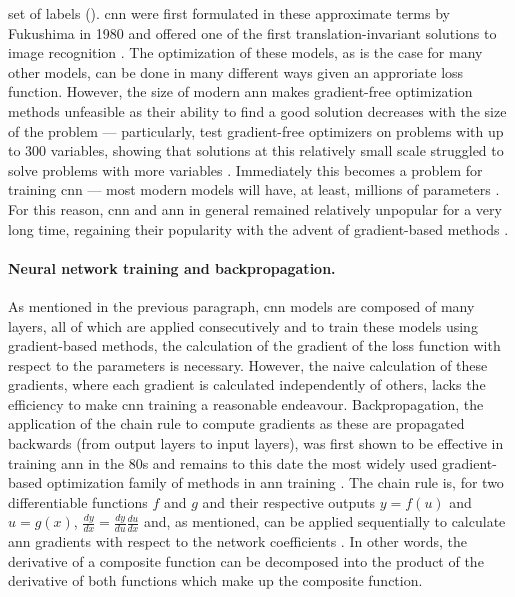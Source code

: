 set of labels (). \ac{cnn} were first formulated in these approximate terms by Fukushima in 1980 and offered one of the first translation-invariant solutions to image recognition \cite{Fukushima1980-bk}. The optimization of these models, as is the case for many other models, can be done in many different ways given an approriate loss function. However, the size of modern \ac{ann} makes gradient-free optimization methods unfeasible as their ability to find a good solution decreases with the size of the problem --- particularly,  test gradient-free optimizers on problems with up to 300 variables, showing that solutions at this relatively small scale struggled to solve problems with more variables \cite{Rios2013-bx}. Immediately this becomes a problem for training \ac{cnn} --- most modern models will have, at least, millions of parameters \cite{Li2021-xu}. For this reason, \ac{cnn} and \ac{ann} in general remained relatively unpopular for a very long time, regaining their popularity with the advent of gradient-based methods \cite{Kurenkov_undated-pu}.

\begin{figure}
	\label{fig:cnn}
\end{figure}

\paragraph{Neural network training and backpropagation.} As mentioned in the previous paragraph, \ac{cnn} models are composed of many layers, all of which are applied consecutively and to train these models using gradient-based methods, the calculation of the gradient of the loss function with respect to the parameters is necessary. However, the naive calculation of these gradients, where each gradient is calculated independently of others, lacks the efficiency to make \ac{cnn} training a reasonable endeavour. Backpropagation, the application of the chain rule to compute gradients as these are propagated backwards (from output layers to input layers), was first shown to be effective in training \ac{ann} in the 80s and remains to this date the most widely used gradient-based optimization family of methods in \ac{ann} training \cite{Rumelhart1986-tl,LeCun1989-ro}. The chain rule is, for two differentiable functions $f$ and $g$ and their respective outputs $y = f(u)$ and $u = g(x)$, $\frac{dy}{dx} = \frac{dy}{du}\frac{du}{dx}$ and, as mentioned, can be applied sequentially to calculate \ac{ann} gradients with respect to the network coefficients \cite{Rumelhart1986-tl}. In other words, the derivative of a composite function can be decomposed into the product of the derivative of both functions which make up the composite function. 

